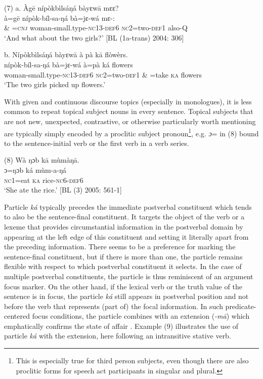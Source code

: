 \documentclass[output=paper]{langsci/langscibook}
\begin{document}
\gll \textup{(7)  a.}  Àg\={e}  nípòkbìlsáŋá        bàyɛw\={a}    mɛɛ?\\
\gll \textup{à=g\={e}  nípòk-bíl-sa-ŋá      bà=jɛ-wá    mɛ-:}\\
     \& =\textsc{cnj}  woman-small.type-\textsc{nc}13-\textsc{def}6  \textsc{nc}2=two-\textsc{def}1  also-\textsc{Q}\\
\glt   ‘And what about the two girls?’ [BL (1a-trans) 2004: 306]
\z

\gll   \textup{b.}  Nípòkbìlsáŋá  bàyɛw\={a}  à  pà  k\={a}  flòwèrs.\\
     nípòk-bíl-sa-ŋá  bà=jɛ-wá  à=pà  ká  flowers\\
     woman-small.type-\textsc{nc}13-\textsc{def}6  \textsc{nc}2=two-\textsc{def}1  \& =take  \textsc{ka}  flowers\\
    ‘The two girls picked up flowers.’ \citep[271]{Schwarz2009}

With given and continuous discourse topics (especially in monologues), it is less common to repeat topical subject nouns in every sentence. Topical subjects that are not new, unexpected, contrastive, or otherwise particularly worth mentioning are typically simply encoded by a proclitic subject pronoun\footnote{ This is especially true for third person subjects, even though there are also proclitic forms for speech act participants in singular and plural. }, e.g. \textit{ɔ}= in (8) bound to the sentence-initial verb or the first verb in a verb series. 

\gll \textup{(8)}  Wà ŋɔb  k\={a}  mùmàŋ\={a}.\\
\gll \textup{ɔ=ŋɔb    ká  mùm-a-ŋá}\\
     \textsc{nc1}=eat  \textsc{ka}  rice-\textsc{nc}6-\textsc{def}6\\
\glt ‘She ate the rice.’ [BL (3) 2005: 561-1]
\z

Particle \textit{ká }typically precedes the immediate postverbal constituent which tends to also be the sentence-final constituent. It targets the object of the verb or a lexeme that provides circumstantial information in the postverbal domain by appearing at the left edge of this constituent and setting it literally apart from the preceding information. There seems to be a preference for marking the sentence-final constituent, but if there is more than one, the particle remains flexible with respect to which postverbal constituent it selects. In the case of multiple postverbal constituents, the particle is thus reminiscent of an argument focus marker. On the other hand, if the lexical verb or the truth value of the sentence is in focus, the particle \textit{ká }still appears in postverbal position and not before the verb that represents (part of) the focal information. In such predicate-centered focus conditions, the particle combines with an extension (\textit{{}-m\={a}}) which emphatically confirms the state of affair \citep{Schwarz2010b}. Example (9) illustrates the use of particle \textit{ká }with the extension, here following an intransitive stative verb.
\end{document}
